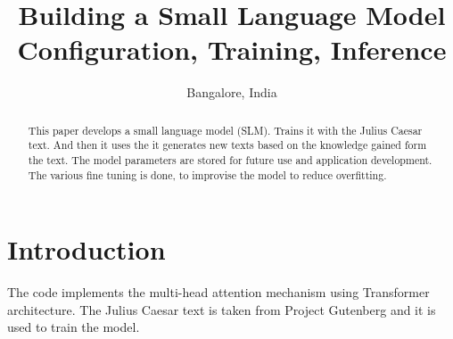 \documentclass[conference]{IEEEtran}
\begin{document}
\title{Building a Small Language Model \\ Configuration, Training, Inference}

\author{
Bangalore, India}

\maketitle

\begin{abstract}
This paper develops a small language model (SLM). Trains it with the Julius Caesar text. And then it uses the it generates new texts based on the knowledge gained form the text. The model parameters are stored for future use and application development. The various fine tuning is done, to improvise the model to reduce overfitting. 
\end{abstract}

\section{Introduction}
The code implements the multi-head attention mechanism using Transformer architecture. The Julius Caesar text is taken from Project Gutenberg and it is used to train the model. 
\end{document}
